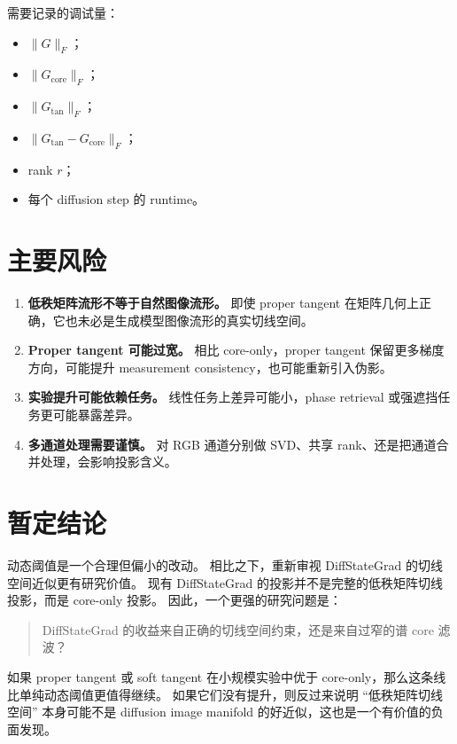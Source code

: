 \documentclass[11pt]{article}
\begin{document}
需要记录的调试量：
\begin{itemize}
    \item $\|G\|_F$；
    \item $\|G_{\mathrm{core}}\|_F$；
    \item $\|G_{\mathrm{tan}}\|_F$；
    \item $\|G_{\mathrm{tan}} - G_{\mathrm{core}}\|_F$；
    \item rank $r$；
    \item 每个 diffusion step 的 runtime。
\end{itemize}

\section{主要风险}

\begin{enumerate}[label=\textbf{R\arabic*.}]
    \item \textbf{低秩矩阵流形不等于自然图像流形。}
    即使 proper tangent 在矩阵几何上正确，它也未必是生成模型图像流形的真实切线空间。

    \item \textbf{Proper tangent 可能过宽。}
    相比 core-only，proper tangent 保留更多梯度方向，可能提升 measurement consistency，也可能重新引入伪影。

    \item \textbf{实验提升可能依赖任务。}
    线性任务上差异可能小，phase retrieval 或强遮挡任务更可能暴露差异。

    \item \textbf{多通道处理需要谨慎。}
    对 RGB 通道分别做 SVD、共享 rank、还是把通道合并处理，会影响投影含义。
\end{enumerate}

\section{暂定结论}

动态阈值是一个合理但偏小的改动。
相比之下，重新审视 DiffStateGrad 的切线空间近似更有研究价值。
现有 DiffStateGrad 的投影并不是完整的低秩矩阵切线投影，而是 core-only 投影。
因此，一个更强的研究问题是：
\begin{quote}
DiffStateGrad 的收益来自正确的切线空间约束，还是来自过窄的谱 core 滤波？
\end{quote}
如果 proper tangent 或 soft tangent 在小规模实验中优于 core-only，那么这条线比单纯动态阈值更值得继续。
如果它们没有提升，则反过来说明 ``低秩矩阵切线空间'' 本身可能不是 diffusion image manifold 的好近似，这也是一个有价值的负面发现。
\end{document}
